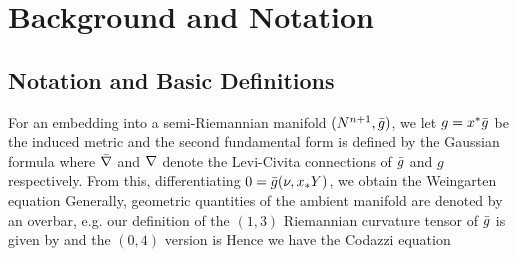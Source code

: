 \section{Background and Notation}

\subsection{Notation and Basic Definitions}
\label{subsec:bg_notation}

For an embedding into a semi-Riemannian manifold $(N^{n+1},\-g)$, 
we let $g=x^{*}\-g$ be the induced metric and the second fundamental form is defined by the Gaussian formula
where $\-\n$ and $\n$ denote the Levi-Civita connections of $\-g$ and $g$ respectively. From this, differentiating $0=\-g(\nu,{x_{*}Y})$, we obtain the Weingarten equation
Generally, geometric quantities of the ambient manifold are denoted by an overbar, e.g. our definition of the $(1,3)$ Riemannian curvature tensor of $\-g$ is given by
and the $(0,4)$ version is
Hence we have the Codazzi equation



